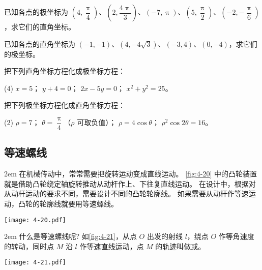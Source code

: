 \begin{Practice}
  \begin{question}
    \item 已知各点的极坐标为 $\left(4,\dfrac{\uppi}{4}\right)$、$\left( 2,\dfrac{4\uppi}{3}\right)$、$(-7,\uppi)$、$\left(5,\dfrac{\uppi}{2}\right)$、$\left(-2,-\dfrac{\uppi}{6}\right)$，求它们的直角坐标。
    \item 已知各点的直角坐标为 $(-1,-1)$、$(4,-4\sqrt{3})$、$(-3,4)$、$(0,-4)$，求它们的极坐标。
    \item 把下列直角坐标方程化成极坐标方程：
    \begin{tasks}(4)
      \task $x=5$；
      \task $y+4=0$；
      \task $2x-5y=0$；
      \task $x^2+y^2=25$。
    \end{tasks}
    \item 把下列极坐标方程化成直角坐标方程：
    \begin{tasks}(2)
      \task $\rho=7$；
      \task $\theta=\dfrac{\uppi}{4}$（$\rho$ 可取负值）；
      \task $\rho=4\cos\theta$；
      \task $\rho^2\cos2\theta=16$。
    \end{tasks}
  \end{question}
\end{Practice}

\subsection{等速螺线}
\medskip\noindent
\begin{minipage}{0.65\linewidth}\parindent2em
在机械传动中，常常需要把旋转运动变成直线运动。
\cref{fig:4-20} 中的凸轮装置就是借助凸轮绕定轴旋转推动从动杆作上、下往复直线运动。
在设计中，根据对从动杆运动的要求不同，需要设计不同的凸轮轮廓线。
如果需要从动杆作等速运动，凸轮的轮廓线就要用等速螺线。
\end{minipage}\hfill
\begin{minipage}{0.3\linewidth}
  \begin{figurehere}
    \texttt{[image: 4-20.pdf]}
    \caption{}\label{fig:4-20}
  \end{figurehere}
\end{minipage}

\medskip\noindent
\begin{minipage}{0.65\linewidth}\parindent2em
什么是等速螺线呢? 如\cref{fig:4-21}，从点 $O$ 出发的射线 $l$，绕点 $O$ 作等角速度的转动，同时点 $M$ 沿 $l$ 作等速直线运动，点 $M$ 的轨迹叫做或。
\end{minipage}\hfill
\begin{minipage}{0.3\linewidth}
\begin{figurehere}
  \texttt{[image: 4-21.pdf]}
  \caption{}\label{fig:4-21}
\end{figurehere}
\end{minipage}

